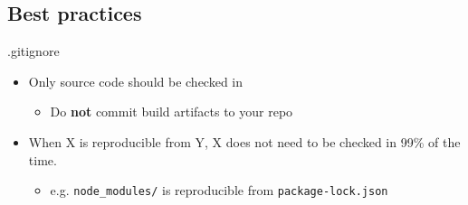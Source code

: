 \documentclass{beamer}
\begin{document}
\subsection{Best practices}

\begin{frame}{.gitignore}
  \begin{itemize}
    \item Only source code should be checked in
      \begin{itemize}
        \item Do \textbf{not} commit build artifacts to your repo
      \end{itemize}
    \item When X is reproducible from Y, X does not need to be checked in 99\%
      of the time.
      \begin{itemize}
        \item e.g. \texttt{node\_modules/} is reproducible from
          \texttt{package-lock.json}
      \end{itemize}
  \end{itemize}
\end{frame}
\end{document}
